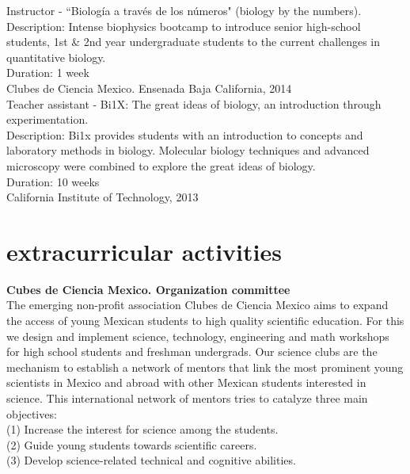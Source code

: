 \documentclass[]{friggeri-cv}
\begin{document}
Instructor - ``Biolog\'{i}a a trav\'{e}s de los n\'{u}meros" (biology by the numbers).\\
Description: Intense biophysics bootcamp to introduce senior high-school students, 1st \& 2nd year undergraduate students to the current challenges in quantitative biology.\\
Duration: 1 week\\
{Clubes de Ciencia Mexico. Ensenada Baja California, 2014}\\

Teacher assistant - Bi1X: The great ideas of biology, an introduction through experimentation.\\
Description: Bi1x provides students with an introduction to concepts and laboratory methods in biology. Molecular biology techniques and advanced microscopy were combined to explore the great ideas of biology.\\
Duration: 10 weeks\\
{California Institute of Technology, 2013}\\

\section{extracurricular activities}
\textbf{Cubes de Ciencia Mexico. Organization committee}\\
The emerging non-profit association Clubes de Ciencia Mexico aims to expand the access of young Mexican students to high quality scientific education. For this we design and implement science, technology, engineering and math workshops for high school students and freshman undergrads. Our science clubs are the mechanism to establish a network of mentors that link the most prominent young scientists in Mexico and abroad with other Mexican students interested in science. This international network of mentors tries to catalyze three main objectives:\\
(1) Increase the interest for science among the students.\\
(2) Guide young students towards scientific careers.\\
(3) Develop science-related technical and cognitive abilities.

\newpage 
\end{document}
